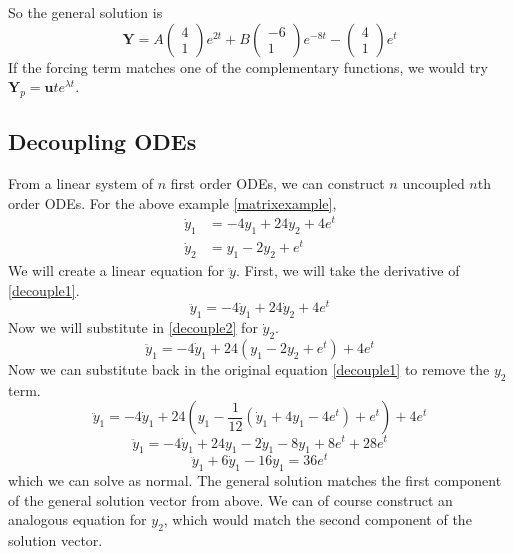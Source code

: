 \documentclass{article}
\begin{document}
So the general solution is
\[ \bm Y = A\begin{pmatrix}
		4 \\ 1
	\end{pmatrix}e^{2t} + B\begin{pmatrix}
		-6 \\ 1
	\end{pmatrix}e^{-8t} - \begin{pmatrix}
		4 \\ 1
	\end{pmatrix}e^t \]
If the forcing term matches one of the complementary functions, we would try $\bm Y_p = \bm u te^{\lambda t}$.

\subsection{Decoupling ODEs}
From a linear system of $n$ first order ODEs, we can construct $n$ uncoupled $n$th order ODEs. For the above example \eqref{matrixexample},
\begin{align}
	\label{decouple1} \dot y_1 & = -4y_1 + 24y_2 + 4e^t \\
	\label{decouple2} \dot y_2 & = y_1 - 2y_2 + e^t
\end{align}
We will create a linear equation for $\ddot y$. First, we will take the derivative of \eqref{decouple1}.
\[ \ddot y_1 = -4\dot y_1 + 24\dot y_2 + 4e^t \]
Now we will substitute in \eqref{decouple2} for $\dot y_2$.
\[ \ddot y_1 = -4\dot y_1 + 24(y_1 - 2y_2 + e^t) + 4e^t \]
Now we can substitute back in the original equation \eqref{decouple1} to remove the $y_2$ term.
\[ \ddot y_1 = -4\dot y_1 + 24\left(y_1 - \frac{1}{12}(\dot y_1 + 4y_1 - 4e^t) + e^t\right) + 4e^t \]
\[ \ddot y_1 = -4\dot y_1 + 24y_1 - 2\dot y_1 - 8y_1 + 8e^t + 28e^t \]
\[ \ddot y_1 + 6\dot y_1 - 16y_1 = 36e^t \]
which we can solve as normal. The general solution matches the first component of the general solution vector from above. We can of course construct an analogous equation for $y_2$, which would match the second component of the solution vector.
\end{document}
